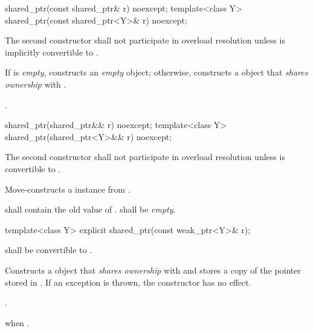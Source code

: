 %
\begin{itemdecl}
shared_ptr(const shared_ptr& r) noexcept;
template<class Y> shared_ptr(const shared_ptr<Y>& r) noexcept;
\end{itemdecl}

\begin{itemdescr}
\pnum\remark
The second constructor shall not participate in overload resolution unless
 is implicitly convertible to .

\pnum\effects  If  is \textit{empty}, constructs
an \textit{empty}  object; otherwise, constructs
a  object that \textit{shares ownership} with .

\pnum\postconditions  {}.
\end{itemdescr}

%
\begin{itemdecl}
shared_ptr(shared_ptr&& r) noexcept;
template<class Y> shared_ptr(shared_ptr<Y>&& r) noexcept;
\end{itemdecl}

\begin{itemdescr}
\pnum
\remark The second constructor shall not participate in overload resolution unless
 is convertible to .

\pnum
\effects Move-constructs a  instance from
.

\pnum
\postconditions {} shall contain the old value of
.  shall be \textit{empty}. 
\end{itemdescr}

%
%
\begin{itemdecl}
template<class Y> explicit shared_ptr(const weak_ptr<Y>& r);
\end{itemdecl}

\begin{itemdescr}
\pnum\requires {} shall be convertible to .

\pnum\effects  Constructs a  object that \textit{shares ownership} with
 and stores a copy of the pointer stored in .
If an exception is thrown, the constructor has no effect.

\pnum\postconditions  {}.

\pnum\throws  {} when .
\end{itemdescr}

